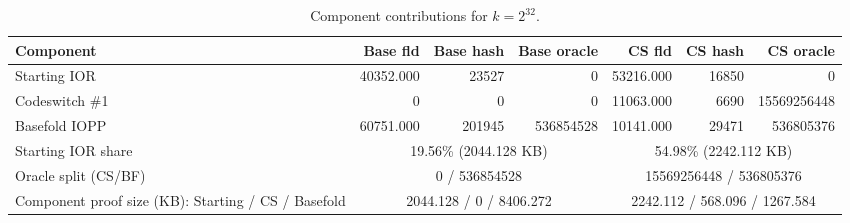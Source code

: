\begin{table}[htbp]
\centering
\caption{Component contributions for $k=2^{32}$.}
\begin{tabular}{lrrrrrr}
\toprule
Component & Base fld & Base hash & Base oracle & CS fld & CS hash & CS oracle \\
\midrule
Starting IOR & 40352.000 & 23527 & 0 & 53216.000 & 16850 & 0 \\
Codeswitch \#1 & 0 & 0 & 0 & 11063.000 & 6690 & 15569256448 \\
Basefold IOPP & 60751.000 & 201945 & 536854528 & 10141.000 & 29471 & 536805376 \\
Starting IOR share & \multicolumn{3}{c}{19.56\% (2044.128 KB)} & \multicolumn{3}{c}{54.98\% (2242.112 KB)} \\
Oracle split (CS/BF) & \multicolumn{3}{c}{0 / 536854528} & \multicolumn{3}{c}{15569256448 / 536805376} \\
Component proof size (KB): Starting / CS / Basefold & \multicolumn{3}{c}{2044.128 / 0 / 8406.272} & \multicolumn{3}{c}{2242.112 / 568.096 / 1267.584} \\
\bottomrule
\end{tabular}
\end{table}

